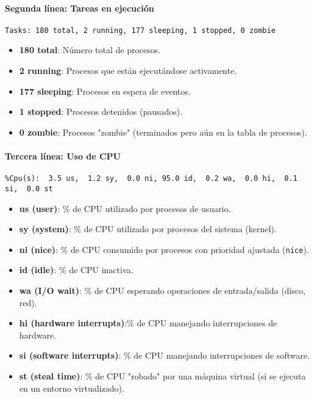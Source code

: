 \paragraph{Segunda línea: Tareas en ejecución}
\begin{verbatim}
Tasks: 180 total, 2 running, 177 sleeping, 1 stopped, 0 zombie
\end{verbatim}
\begin{itemize}
  \item \textbf{180 total}: Número total de procesos.
  \item \textbf{2 running}: Procesos que están ejecutándose activamente.
  \item \textbf{177 sleeping}: Procesos en espera de eventos.
  \item \textbf{1 stopped}: Procesos detenidos (pausados).
  \item \textbf{0 zombie}: Procesos "zombie" (terminados pero aún en la tabla de procesos).
\end{itemize}

\paragraph{Tercera línea: Uso de CPU}
\begin{verbatim}
%Cpu(s):  3.5 us,  1.2 sy,  0.0 ni, 95.0 id,  0.2 wa,  0.0 hi,  0.1 si,  0.0 st
\end{verbatim}
\begin{itemize}
  \item \textbf{us (user)}: \% de CPU utilizado por procesos de usuario.
  \item \textbf{sy (system)}: \% de CPU utilizado por procesos del sistema (kernel).
  \item \textbf{ni (nice)}: \% de CPU consumido por procesos con prioridad ajustada (\texttt{nice}).
  \item \textbf{id (idle)}: \% de CPU inactiva.
  \item \textbf{wa (I/O wait)}: \% de CPU esperando operaciones de entrada/salida (disco, red).
  \item \textbf{hi (hardware interrupts)}:\% de CPU manejando interrupciones de hardware.
  \item \textbf{si (software interrupts)}: \% de CPU manejando interrupciones de software.
  \item \textbf{st (steal time)}: \% de CPU "robado" por una máquina virtual (si se ejecuta en un entorno virtualizado).
\end{itemize}

